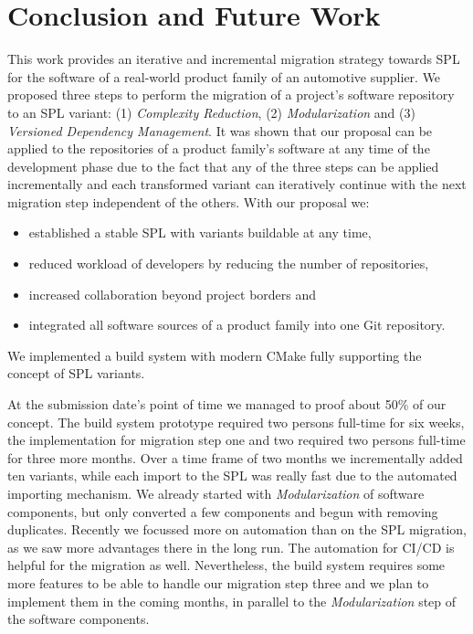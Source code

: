 \section{Conclusion and Future Work}\label{conclusion}

This work provides an iterative and incremental migration strategy towards SPL
for the software of a real-world product family of an automotive supplier. We
proposed three steps to perform the migration of a project's software repository
to an SPL variant: (1) \textit{Complexity Reduction}, (2)
\textit{Modularization} and (3) \textit{Versioned Dependency Management}. It was
shown that our proposal can be applied to the repositories of a product family's
software at any time of the development phase due to the fact that any of the
three steps can be applied incrementally and each transformed variant can
iteratively continue with the next migration step independent of the others.
With our proposal we:

\begin{itemize}
  \item established a stable SPL with variants buildable at any time,
  \item reduced workload of developers by reducing the number of repositories,
  \item increased collaboration beyond project borders and
  \item integrated all software sources of a product family into one Git
        repository.
\end{itemize}

We implemented a build system with modern CMake fully supporting the concept of
SPL variants.

At the submission date's point of time we managed to proof about 50\% of our
concept. The build system prototype required two persons full-time for six
weeks, the implementation for migration step one and two required two persons
full-time for three more months. Over a time frame of two months we
incrementally added ten variants, while each import to the SPL was really fast
due to the automated importing mechanism. We already started with
\textit{Modularization} of software components, but only converted a few
components and begun with removing duplicates. Recently we focussed more on
automation than on the SPL migration, as we saw more advantages there in the
long run. The automation for CI/CD is helpful for the migration as well.
Nevertheless, the build system requires some more features to be able to handle
our migration step three and we plan to implement them in the coming months, in
parallel to the \textit{Modularization} step of the software components.

